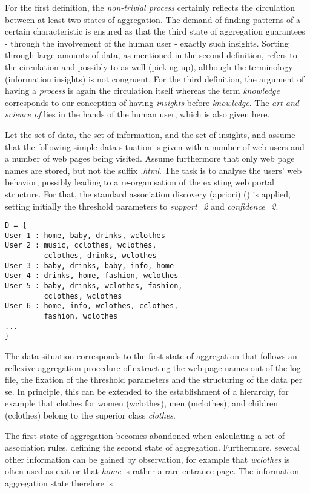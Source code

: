 \documentclass[10pt,latex8]{article}
\begin{document}
For the first definition, the \textit{non-trivial process} certainly reflects the circulation between at least two states of aggregation. The demand of finding patterns of a certain characteristic is ensured as that the third state of aggregation guarantees - through the involvement of the human user - exactly such insights. Sorting through large amounts of data, as mentioned in the second definition, refers to the circulation  and possibly to  as well (picking up), although the terminology (information  insights) is not congruent. For the third definition, the argument of having a \textit{process} is again the circulation itself whereas the term \textit{knowledge} corresponds to our conception of having \textit{insights} before \textit{knowledge}. The \textit{art and science of} lies in the hands of the human user, which is also given here.

Let  the set of data,  the set of information, and  the set of insights, and assume that the following simple data situation is given with a number of web users and a number of web pages being visited. Assume furthermore that only web page names are stored, but not the suffix \textit{.html}. The task is to analyse the users' web behavior, possibly leading to a re-organisation of the existing web portal structure. For that, the standard association discovery (apriori) (\cite{agrawal}) is applied, setting initially the threshold parameters to \textit{support=2} and \textit{confidence=2}.

{\small
\begin{verbatim}
D = {
User 1 : home, baby, drinks, wclothes
User 2 : music, cclothes, wclothes,
         cclothes, drinks, wclothes
User 3 : baby, drinks, baby, info, home 
User 4 : drinks, home, fashion, wclothes 
User 5 : baby, drinks, wclothes, fashion,
         cclothes, wclothes
User 6 : home, info, wclothes, cclothes,
         fashion, wclothes 
...
}
\end{verbatim}
}
The data situation corresponds to the first state of aggregation that follows an reflexive aggregation procedure of extracting the web page names out of the log-file, the fixation of the threshold parameters and the structuring of the data per se. In principle, this can be extended to the establishment of a hierarchy, for example that clothes for women (wclothes), men (mclothes), and children (cclothes) belong to the superior class \textit{clothes}.

The first state of aggregation becomes abandoned when calculating a set of association rules, defining the second state of aggregation. Furthermore, several other information can be gained by observation, for example that \textit{wclothes} is often used as exit or that \textit{home} is rather a rare entrance page. The information aggregation state therefore is 
\end{document}
